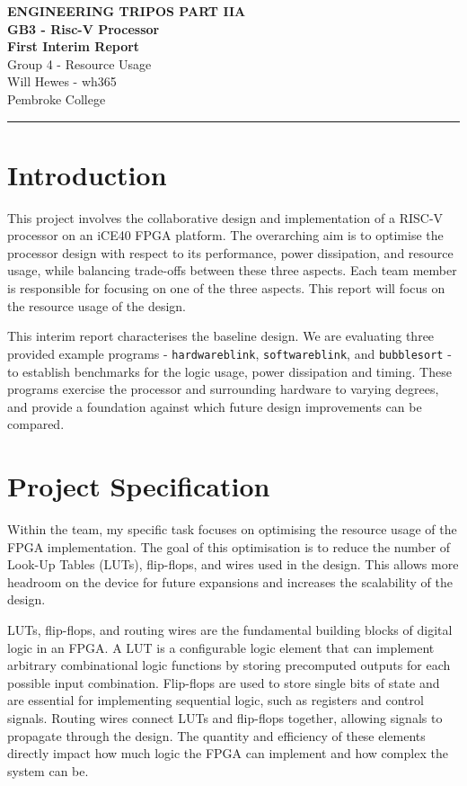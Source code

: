 \documentclass[a4paper,10pt]{article}
\renewcommand{\maketitle}{
    \begin{center}
        \LARGE \textbf{ENGINEERING TRIPOS PART IIA} \\ 
        \vspace{0.5em}
        \Large \textbf{GB3 - Risc-V Processor} \\ 
        \vspace{0.5em}
        \textbf{First Interim Report} \\
        \large Group 4 - Resource Usage \\
        \vspace{1em}
        \large Will Hewes - wh365 \\ 
        Pembroke College \\ 
        \vspace{0.5em}
    \end{center}
}
\begin{document}
\maketitle
\hrule
\tableofcontents
\newpage

\section{Introduction}
\label{sec:Introduction}

This project involves the collaborative design and implementation 
of a RISC-V processor on an iCE40 FPGA platform. 
The overarching aim is to optimise 
the processor design with respect to its 
performance, power dissipation, and resource usage, 
while balancing trade-offs between these three aspects. 
Each team member is responsible for focusing on one of the three aspects.
This report will focus on the resource usage of the design.

This interim report characterises the baseline design. 
We are evaluating three provided example programs - 
\texttt{hardwareblink}, \texttt{softwareblink}, and \texttt{bubblesort} - 
to establish benchmarks for the logic usage, power dissipation and timing. 
These programs exercise the processor and surrounding hardware to varying degrees, 
and provide a foundation against which future design improvements can be compared.


\section{Project Specification}
\label{sec:Project_Specification}

Within the team, my specific task focuses on 
optimising the resource usage of the FPGA implementation. 
The goal of this optimisation is to reduce the number of 
Look-Up Tables (LUTs), flip-flops, and wires used in the design. 
This allows more headroom on the device for future expansions 
and increases the scalability of the design.

LUTs, flip-flops, and routing wires are 
the fundamental building blocks of digital logic in an FPGA. 
A LUT is a configurable logic element that can implement 
arbitrary combinational logic functions 
by storing precomputed outputs for each possible input combination. 
Flip-flops are used to store single bits of state and 
are essential for implementing sequential logic, 
such as registers and control signals. 
Routing wires connect LUTs and flip-flops together, 
allowing signals to propagate through the design. 
The quantity and efficiency of these elements directly impact 
how much logic the FPGA can implement and how complex the system can be.
\end{document}
